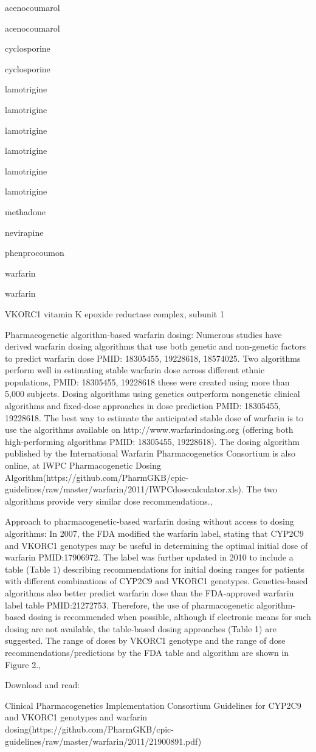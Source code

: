 \documentclass{resume} %
\begin{document}
\begin{rSection}{ acenocoumarol }
\begin{rSection}{ acenocoumarol }
\begin{rSection}{ cyclosporine }
\begin{rSection}{ cyclosporine }
\begin{rSection}{ lamotrigine }
\begin{rSection}{ lamotrigine }
\begin{rSection}{ lamotrigine }
\begin{rSection}{ lamotrigine }
\begin{rSection}{ lamotrigine }
\begin{rSection}{ lamotrigine }
\begin{rSection}{ methadone }
\begin{rSection}{ nevirapine }
\begin{rSection}{ phenprocoumon }
\begin{rSection}{ warfarin }
\begin{rSection}{ warfarin }
\begin{rSubsection}{ VKORC1 }{ vitamin K epoxide reductase complex, subunit 1 }{}{}
\item Pharmacogenetic algorithm-based warfarin dosing: Numerous studies have derived warfarin dosing algorithms that use both genetic and non-genetic factors to predict warfarin dose PMID: 18305455, 19228618, 18574025. Two algorithms perform well in estimating stable warfarin dose across different ethnic populations,  PMID: 18305455, 19228618 these were created using more than 5,000 subjects. Dosing algorithms using genetics outperform nongenetic clinical algorithms and fixed-dose approaches in dose prediction PMID: 18305455, 19228618. The best way to estimate the anticipated stable dose of warfarin is to use the algorithms available on http://www.warfarindosing.org (offering both high-performing algorithms PMID: 18305455, 19228618). The dosing algorithm published by the International Warfarin Pharmacogenetics Consortium is also online, at IWPC Pharmacogenetic Dosing Algorithm(https://github.com/PharmGKB/cpic-guidelines/raw/master/warfarin/2011/IWPCdosecalculator.xls). The two algorithms provide very similar dose recommendations., 
 \newline
\item Approach to pharmacogenetic-based warfarin dosing without access to dosing algorithms:     In 2007, the FDA modified the warfarin label, stating that CYP2C9 and VKORC1 genotypes may be useful in determining the optimal initial dose of warfarin PMID:17906972. The label was further updated in 2010 to include a table (Table 1) describing recommendations for initial dosing ranges for patients with different combinations of CYP2C9 and VKORC1 genotypes. Genetics-based algorithms also better predict warfarin dose than the FDA-approved warfarin label table PMID:21272753. Therefore, the use of pharmacogenetic algorithm-based dosing is recommended when possible, although if electronic means for such dosing are not available, the table-based dosing approaches (Table 1) are suggested. The range of doses by VKORC1 genotype and the range of dose recommendations/predictions by the FDA table and algorithm are shown in Figure 2., 
 \newline
\item Download and read: 
 \newline
\item Clinical Pharmacogenetics Implementation Consortium Guidelines for CYP2C9 and VKORC1 genotypes and warfarin dosing(https://github.com/PharmGKB/cpic-guidelines/raw/master/warfarin/2011/21900891.pdf)
 \newline

\end{rSubsection}
\end{rSection}
\end{rSection}
\end{rSection}
\end{rSection}
\end{rSection}
\end{rSection}
\end{rSection}
\end{rSection}
\end{rSection}
\end{rSection}
\end{rSection}
\end{rSection}
\end{rSection}
\end{rSection}
\end{rSection}
\end{document}
